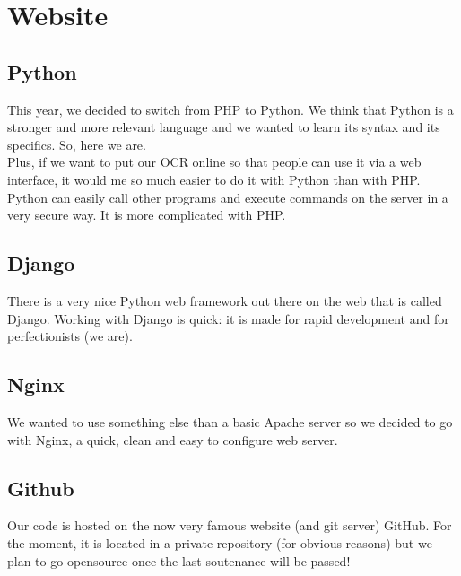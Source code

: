 \chapter{Website}

\section{Python}

\begin{center}
\end{center}

This year, we decided to switch from PHP to Python. We think that Python is a
stronger and more relevant language and we wanted to learn its syntax and its
specifics. So, here we are. \\

Plus, if we want to put our OCR online so that people can use it via a web
interface, it would me so much easier to do it with Python than with PHP. Python
can easily call other programs and execute commands on the server in a very
secure way. It is more complicated with PHP.

\section{Django}

\begin{center}
\end{center}

There is a very nice Python web framework out there on the web that is called
Django. Working with Django is quick: it is made for rapid development and for
perfectionists (we are).

\section{Nginx}

\begin{center}
\end{center}

We wanted to use something else than a basic Apache server so we decided to go
with Nginx, a quick, clean and easy to configure web server.

\section{Github}

\begin{center}
\end{center}

Our code is hosted on the now very famous website (and git server) GitHub. For
the moment, it is located in a private repository (for obvious reasons) but we
plan to go opensource once the last soutenance will be passed!
